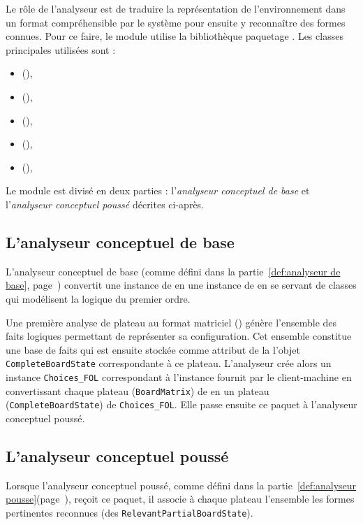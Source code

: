 Le rôle de l'analyseur est de traduire la représentation de l'environnement dans un format compréhensible par le système pour ensuite y reconnaître des formes connues. Pour ce faire, le module utilise la bibliothèque  paquetage . Les classes principales utilisées sont :

\begin{itemize}
  \item {} (),
  \item {} (),
  \item {} (),
  \item {} (),
  \item {} (),
\end{itemize}

Le module est divisé en deux parties : l'\emph{analyseur conceptuel de base} et l'\emph{analyseur conceptuel poussé} décrites ci-après.
 
\subsection{L'analyseur conceptuel de base}
L'analyseur conceptuel de base (comme défini dans la partie~\ref{def:analyseur de base}, page~\pageref{def:analyseur de base}) convertit une instance de  en une instance de  en se servant de classes qui modélisent la logique du premier ordre. 

Une première analyse de plateau au format matriciel () génère l'ensemble des faits logiques permettant de représenter sa configuration. Cet ensemble constitue une base de faits qui est ensuite stockée comme attribut de la l'objet \texttt{CompleteBoardState} correspondante à ce plateau. L'analyseur crée alors un instance \texttt{Choices\_FOL} correspondant à l'instance  fournit par le \gls{client-machine} en convertissant chaque plateau (\texttt{BoardMatrix}) de  en un plateau (\texttt{CompleteBoardState}) de \texttt{Choices\_FOL}. Elle passe ensuite ce paquet à l'analyseur conceptuel poussé. 
\subsection{L'analyseur conceptuel poussé}
Lorsque l'analyseur conceptuel poussé, comme défini dans la partie~\ref{def:analyseur pousse}(page~\pageref{def:analyseur pousse}), reçoit ce paquet, il associe à chaque plateau l'ensemble les formes pertinentes reconnues (des \texttt{RelevantPartialBoardState}).

